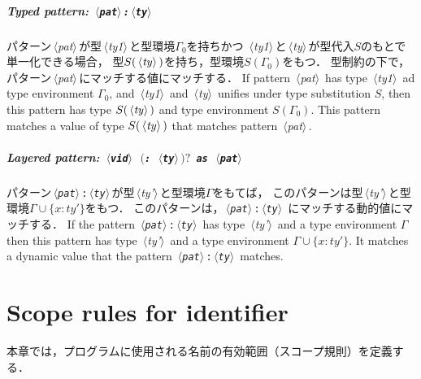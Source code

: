 \documentclass{jbook}
\newcommand{\txt}[2]{#2}
\newcommand{\code}[1]{\mbox{\large\tt #1}}
\newcommand{\nonterm}[1]{\mbox{$\,\langle$}{\it #1}\mbox{$\rangle\,$}}
\newcommand{\term}[1]{\mbox{{\tt #1}}}
\newcommand{\optional}[1]{\mbox{$($}{\protect #1}\mbox{$)?$}}
\newcommand{\ass}{\Gamma}
\begin{document}
\paragraph{\txt{型制約パターン}{Typed pattern}: \code{\nonterm{pat}:\nonterm{ty}}}

\ifjp%
	パターン\nonterm{pat}が型\nonterm{ty1}と型環境$\ass_0$を持ちかつ
\nonterm{ty1}と\nonterm{ty}が型代入$S$のもとで単一化できる場合，
型$S(\nonterm{ty})$を持ち，型環境$S(\ass_0)$をもつ．
	型制約の下で，パターン\nonterm{pat}にマッチする値にマッチする．
\else%
	If pattern \nonterm{pat} has type \nonterm{ty1} ad type
environment $\ass_0$, and \nonterm{ty1} and \nonterm{ty} unifies under
type substitution $S$, then this pattern has type $S(\nonterm{ty})$ and
type environment $S(\ass_0)$.
	This pattern matches a value of type $S(\nonterm{ty})$ that
matches pattern \nonterm{pat}.
\fi%

\paragraph{\txt{多層パターン}{Layered pattern}: \code{\nonterm{vid}\ \optional{\term{:}\ \nonterm{ty}} {\tt as}\ \nonterm{pat}}}

\ifjp%
	パターン\code{\nonterm{pat}:\nonterm{ty}}が型\nonterm{ty'}と型環境$\ass$をもてば，
このパターンは型\nonterm{ty'}と型環境$\ass \cup \{x:ty'\}$をもつ．
	このパターンは，\code{\nonterm{pat}:\nonterm{ty}} にマッチする動的値にマッチする．
\else%
	If the pattern \code{\nonterm{pat}:\nonterm{ty}} has type
\nonterm{ty'} and a type environment $\ass$ then this pattern 
has type \nonterm{ty'} and a type environment $\ass \cup \{x:ty'\}$.
	It matches a dynamic value that the pattern
\code{\nonterm{pat}:\nonterm{ty}} matches. 
\fi%


\chapter{\txt{識別子のスコープ規則}{Scope rules for identifier}}
\label{chap:reference:scope}

\ifjp%
	本章では，プログラムに使用される名前の有効範囲（スコープ規則）を定義する．
\end{document}
